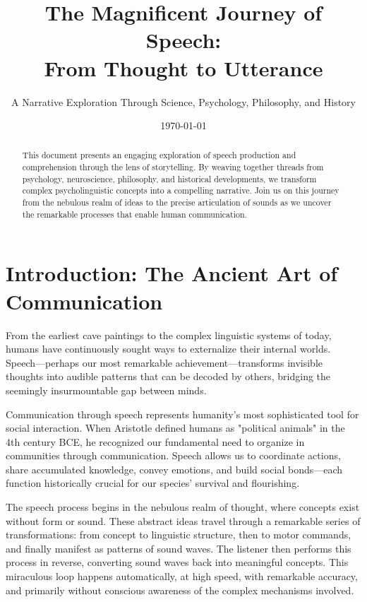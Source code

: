 \documentclass[12pt,a4paper]{article}
\title{\Huge \textbf{The Magnificent Journey of Speech: \\ From Thought to Utterance}}
\author{A Narrative Exploration Through Science, Psychology, Philosophy, and History}
\date{\today}
\begin{document}
\maketitle

\begin{abstract}
This document presents an engaging exploration of speech production and comprehension through the lens of storytelling. By weaving together threads from psychology, neuroscience, philosophy, and historical developments, we transform complex psycholinguistic concepts into a compelling narrative. Join us on this journey from the nebulous realm of ideas to the precise articulation of sounds as we uncover the remarkable processes that enable human communication.
\end{abstract}

\tableofcontents
\newpage

\section{Introduction: The Ancient Art of Communication}

\begin{tcolorbox}[colback=blue!5!white,colframe=blue!75!black,title=The Eternal Human Quest]
From the earliest cave paintings to the complex linguistic systems of today, humans have continuously sought ways to externalize their internal worlds. Speech—perhaps our most remarkable achievement—transforms invisible thoughts into audible patterns that can be decoded by others, bridging the seemingly insurmountable gap between minds.
\end{tcolorbox}

Communication through speech represents humanity's most sophisticated tool for social interaction. When Aristotle defined humans as "political animals" in the 4th century BCE, he recognized our fundamental need to organize in communities through communication. Speech allows us to coordinate actions, share accumulated knowledge, convey emotions, and build social bonds—each function historically crucial for our species' survival and flourishing.

The speech process begins in the nebulous realm of thought, where concepts exist without form or sound. These abstract ideas travel through a remarkable series of transformations: from concept to linguistic structure, then to motor commands, and finally manifest as patterns of sound waves. The listener then performs this process in reverse, converting sound waves back into meaningful concepts. This miraculous loop happens automatically, at high speed, with remarkable accuracy, and primarily without conscious awareness of the complex mechanisms involved.
\end{document}
